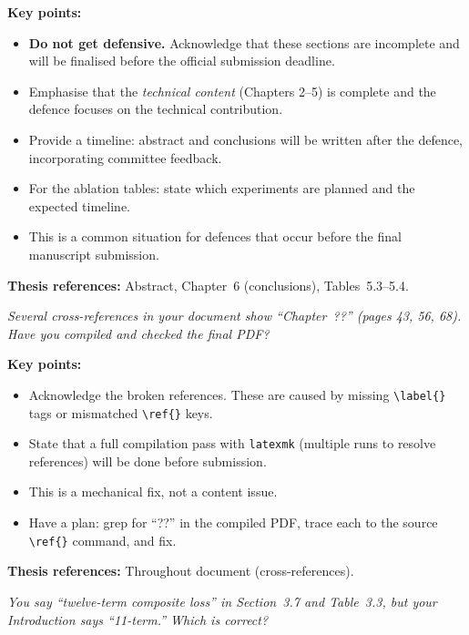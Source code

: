 \documentclass[11pt, letterpaper]{article}
\newcounter{qcounter}
\newcommand{\question}[1]{%
  \stepcounter{qcounter}%
  \begin{questionbox}[Q\theqcounter]%
    \itshape #1%
  \end{questionbox}%
}
\begin{document}
\begin{answerbox}
\textbf{Key points:}
\begin{itemize}[nosep]
  \item \textbf{Do not get defensive.}  Acknowledge that these
        sections are incomplete and will be finalised before the
        official submission deadline.
  \item Emphasise that the \emph{technical content} (Chapters 2--5)
        is complete and the defence focuses on the technical
        contribution.
  \item Provide a timeline: abstract and conclusions will be written
        after the defence, incorporating committee feedback.
  \item For the ablation tables: state which experiments are planned
        and the expected timeline.
  \item This is a common situation for defences that occur before
        the final manuscript submission.
\end{itemize}
\textbf{Thesis references:} Abstract, Chapter~6 (conclusions), Tables~5.3--5.4.
\end{answerbox}

\question{Several cross-references in your document show ``Chapter~??''
(pages 43, 56, 68).  Have you compiled and checked the final PDF?}

\begin{answerbox}
\textbf{Key points:}
\begin{itemize}[nosep]
  \item Acknowledge the broken references.  These are caused by
        missing \verb|\label{}| tags or mismatched \verb|\ref{}| keys.
  \item State that a full compilation pass with \verb|latexmk|
        (multiple runs to resolve references) will be done before
        submission.
  \item This is a mechanical fix, not a content issue.
  \item Have a plan: grep for ``??'' in the compiled PDF, trace each
        to the source \verb|\ref{}| command, and fix.
\end{itemize}
\textbf{Thesis references:} Throughout document (cross-references).
\end{answerbox}

\question{You say ``twelve-term composite loss'' in Section~3.7 and
Table~3.3, but your Introduction says ``11-term.''  Which is
correct?}
\end{document}
